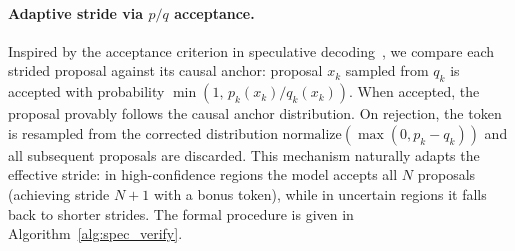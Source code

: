 \paragraph{Adaptive stride via $p/q$ acceptance.}
Inspired by the acceptance criterion in speculative decoding~\citep{leviathan2023speculative}, we compare each strided proposal against its causal anchor: proposal $x_k$ sampled from $q_k$ is accepted with probability $\min(1, \, p_k(x_k) / q_k(x_k))$. When accepted, the proposal provably follows the causal anchor distribution. On rejection, the token is resampled from the corrected distribution $\text{normalize}(\max(0, p_k - q_k))$ and all subsequent proposals are discarded. This mechanism naturally adapts the effective stride: in high-confidence regions the model accepts all $N$ proposals (achieving stride $N{+}1$ with a bonus token), while in uncertain regions it falls back to shorter strides. The formal procedure is given in Algorithm~\ref{alg:spec_verify}.

